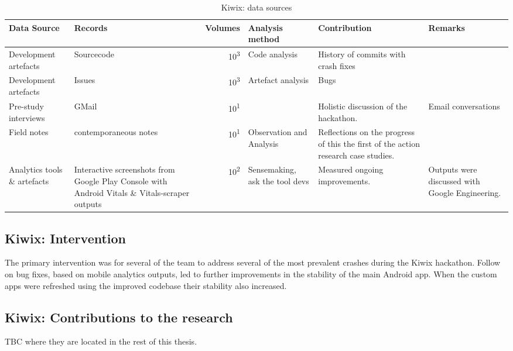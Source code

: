 \begin{table*}
    \centering
    \footnotesize
    \tabcolsep=0.12cm
    \begin{tabular}{>{\raggedright}p{2cm} >{\raggedright}p{3.3cm} r >{\raggedright}p{2.1cm} >{\raggedright}p{2.2cm} >{\raggedright\arraybackslash}p{2.5cm}}
        Data Source & Records & Volumes & Analysis method & Contribution & Remarks \\
        \toprule
         Development artefacts & Sourcecode\footnotemark & 10\textsuperscript{3} & Code analysis & History of commits with crash fixes &  \\
         Development artefacts & Issues\footnotemark & 10\textsuperscript{3} & Artefact analysis & Bugs & \\
         Pre-study interviews & GMail & 10\textsuperscript{1} & & Holistic discussion of the hackathon. & Email conversations \\
         Field notes & contemporaneous notes & 10\textsuperscript{1} & Observation and Analysis & Reflections on the progress of this the first of the action research case studies. & \\
         Analytics tools \& artefacts &Interactive screenshots from Google Play Console with Android Vitals \& Vitals-scraper outputs &10\textsuperscript{2} & Sensemaking, ask the tool devs & Measured ongoing improvements. & Outputs were discussed with Google Engineering. \\
         \bottomrule
    \end{tabular}
    \caption{Kiwix: data sources}
    \label{tab:kiwix-data-sources}
\end{table*}



\subsection{Kiwix: Intervention}
The primary intervention was for several of the team to address several of the most prevalent crashes during the Kiwix hackathon. Follow on bug fixes, based on mobile analytics outputs, led to further improvements in the stability of the main Android app. When the custom apps were refreshed using the improved codebase their stability also increased.

\subsection{Kiwix: Contributions to the research}
TBC where they are located in the rest of this thesis.


